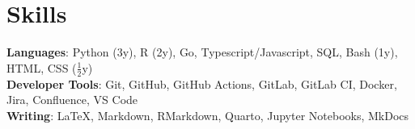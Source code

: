 \section{Skills}

\begin{itemize}[leftmargin=0.15in, label={}]
    \small{\item{
                    \textbf{Languages}{: Python (3y), R (2y), Go, Typescript/Javascript, SQL, Bash (1y), HTML, CSS ($\frac{1}{2}$y)} \\
                    \textbf{Developer Tools}{: Git, GitHub, GitHub Actions, GitLab, GitLab CI, Docker, Jira, Confluence, VS Code} \\
                    \textbf{Writing}{: LaTeX, Markdown, RMarkdown, Quarto, Jupyter Notebooks, MkDocs}
              }}
\end{itemize}
